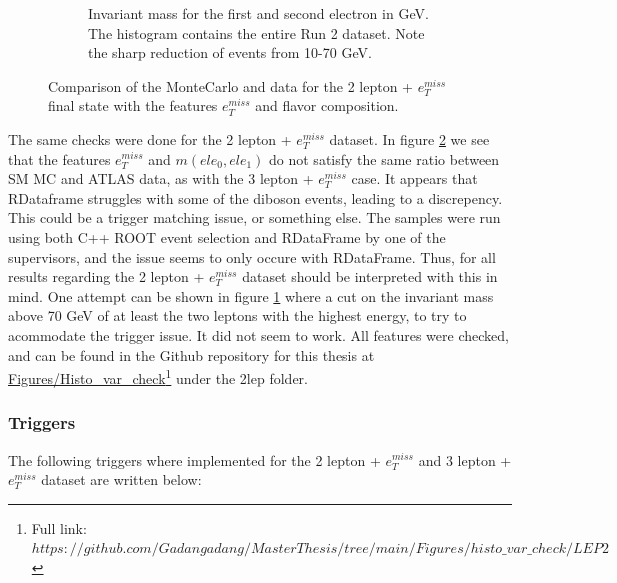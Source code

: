 \begin{figure}[H]
\begin{subfigure}{.6\textwidth}
        \caption{Invariant mass for the first and second electron in GeV. The histogram contains the entire Run 2 dataset. Note the sharp reduction of events from 10-70 GeV.}
        \label{fig:mll_2lep}
    \end{subfigure}
    \hfill        
    \caption[2 lepton + $e_T^{miss}$ MonteCarlo and ATLAS data comparison]{Comparison of the MonteCarlo and data for the 2 lepton + $e_T^{miss}$ final state with the features $e_{T}^{miss}$ and flavor composition.
    }
    \label{fig:MC_Data_comp_2lep}
\end{figure}
The same checks were done for the 2 lepton + $e_T^{miss}$ dataset. In figure \ref{fig:MC_Data_comp_2lep} we see that the features $e_T^{miss}$ and $m(ele_0, ele_1)$ 
do not satisfy the same ratio between SM MC and ATLAS data, as with the 3 lepton + $e_T^{miss}$ case. It appears that RDataframe struggles with some of the diboson events, 
leading to a discrepency. This could be a trigger matching issue, or something else. The samples were run using both C++ ROOT event selection and RDataFrame by one of the supervisors, and the 
issue seems to only occure with RDataFrame. Thus, for all results regarding the 2 lepton + $e_T^{miss}$ dataset should be interpreted with this in mind. One attempt can be shown in 
figure \ref{fig:mll_2lep} where a cut on the invariant mass above 70 GeV of at least the two leptons with the highest energy, to try to acommodate the trigger issue. 
It did not seem to work. All features were checked, and can be found in the Github repository for this thesis at 
\href{https://github.com/Gadangadang/MasterThesis/tree/main}{Figures/Histo\_var\_check}\footnote{Full link: \href{https://github.com/Gadangadang/MasterThesis/tree/main/Figures/histo_var_check/LEP2}{$https://github.com/Gadangadang/MasterThesis/tree/main/Figures/histo\_var\_check/LEP2$}} under the 2lep folder.



\subsubsection*{Triggers }\label{sec:triggers}
The following triggers where implemented for the 2 lepton + $e_T^{miss}$  and 3 lepton + $e_T^{miss}$ dataset are written below:


